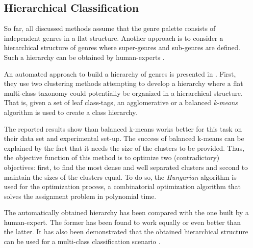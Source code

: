 \subsection{Hierarchical Classification} 

So far, all discussed methods assume that the genre palette consists of independent genres in a flat structure. Another approach is to consider a hierarchical structure of genres where super-genres and sub-genres are defined. Such a hierarchy can be obtained by human-experts \parencite{stubbe2007genre}.

An automated approach to build a hierarchy of genres is presented in \parencite{madjarov2015web}. First, they use two clustering methods attempting to develop a hierarchy where a flat multi-class taxonomy could potentially be organized in a hierarchical structure. That is, given a set of  leaf class-tags, an agglomerative or a balanced \textit{k-means} algorithm is used to create a class hierarchy. 

The reported results show than balanced k-means works better for this task on their data set and experimental set-up. The success of balanced k-means can be explained by the fact that it needs the size of the clusters to be provided. Thus, the objective function of this method is to optimize two (contradictory) objectives: first, to find the most dense and well separated clusters and second to maintain the sizes of the clusters equal. To do so, the \textit{Hungarian} algorithm is used for the optimization process, a combinatorial optimization algorithm that solves the assignment problem in polynomial time.

The automatically obtained hierarchy has been compared with the one built by a human-expert. The former has been found to work equally or even better than the latter. It has also been demonstrated that the obtained hierarchical structure can be used for a multi-class classification scenario \parencite{malinen2014balanced}.  



